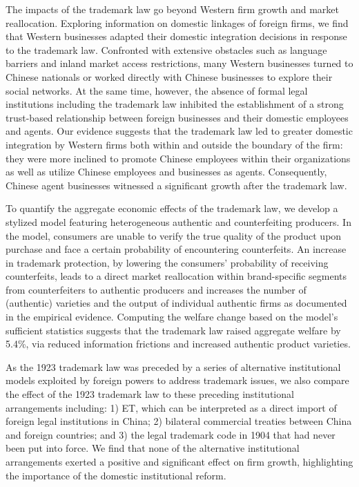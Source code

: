 \documentclass[12pt]{article}
\begin{document}
The impacts of the trademark law  go beyond Western firm growth and market reallocation. Exploring information on domestic linkages of foreign firms, we find that Western businesses adapted their domestic integration decisions in response to the trademark law. Confronted with extensive obstacles such as language barriers and inland market access restrictions, many Western businesses turned to Chinese nationals or worked directly with Chinese businesses to explore their social networks. At the same time, however, the absence of formal legal institutions including the trademark law inhibited the establishment of a strong trust-based relationship between foreign businesses and their domestic employees and agents. Our evidence suggests that the trademark law led to greater domestic integration by Western firms both within and outside the boundary of the firm: they were more inclined to promote Chinese employees within their organizations as well as utilize Chinese employees and businesses as agents. Consequently, Chinese agent businesses witnessed a significant growth after the trademark law.

To quantify the aggregate economic effects of the trademark law, we develop a stylized model featuring heterogeneous authentic and counterfeiting producers.  In the model, consumers are unable to verify the true quality of the product upon purchase and face a certain probability of encountering counterfeits. An increase in trademark protection, by lowering the consumers' probability of receiving counterfeits, leads to a direct market reallocation within brand-specific segments from counterfeiters to authentic producers and increases the number of (authentic) varieties and the output of individual authentic firms as documented in the empirical evidence. Computing the welfare change based on the model's sufficient statistics suggests that the trademark law raised aggregate welfare by 5.4\%, via reduced information frictions and increased authentic product varieties.  

As the 1923 trademark law was preceded by a series of alternative institutional models exploited by foreign powers to address trademark issues, we also compare the effect of the 1923 trademark law to these preceding institutional arrangements including: 1) ET, which can be interpreted as a direct import of foreign legal institutions in China; 2) bilateral commercial treaties between China and foreign countries; and 3) the legal trademark code in 1904 that had never been put into force. We find that none of the alternative institutional arrangements exerted a positive and significant effect on firm growth, highlighting the importance of the domestic institutional reform.
\end{document}
